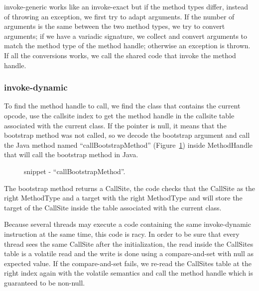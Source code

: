 \documentclass{sig-alternate}
\begin{document}
      invoke-generic works like an invoke-exact but if the method types differ, instead of throwing an exception,
      we first try to adapt arguments.
      If the number of arguments is the same between the two method types, we try to convert arguments;
      if we have a variadic signature, we collect and convert arguments to match the method type of the method handle;
      otherwise an exception is thrown.
      If all the conversions works, we call the shared code that invoke the method handle.
  
    \subsubsection{invoke-dynamic}
      To find the method handle to call, we find the class that contains the current opcode,
      use the callsite index to get the method handle
      in the callsite table associated with the current class.
      If the pointer is null, it means that the bootstrap method was not called,
      so we decode the bootstrap argument and call the Java method named ``callBootstrapMethod'' (Figure~\ref{implBSM})
      inside MethodHandle that will call the bootstrap method in Java.
      
      \begin{figure}[!ht]
        \centering \vspace{-1.5em}
        \caption{snippet - ``callBootstrapMethod''.}\vspace{-1em}
        \label{implBSM}
      \end{figure}

      The bootstrap method returns a CallSite, the code checks that the CallSite as the right MethodType
      and a target with the right MethodType and will store the target of the CallSite inside the table
      associated with the current class.

      Because several threads may execute a code containing the same invoke-dynamic instruction
      at the same time, this code is racy. In order to be sure that every thread sees the same CallSite
      after the initialization, the read inside the CallSites table is a volatile read and the write
      is done using a compare-and-set with null as expected value.
      If the compare-and-set fails, we re-read the CallSites table at the right index again with the volatile semantics
      and call the method handle which is guaranteed to be non-null.   
\end{document}
